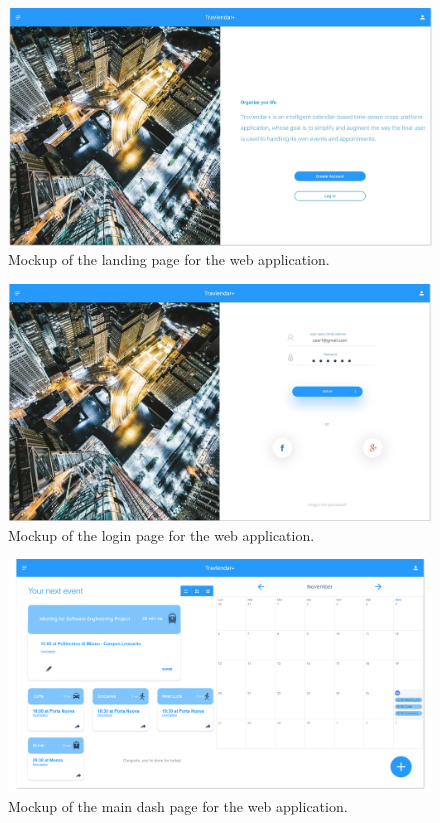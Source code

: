 \begin{figure}
	\centering
	\includegraphics[width=7.5in]{./diagrams/LandingMockupWeb.jpg}
	\caption{Mockup of the landing page for the web application.}
	\label{fig:landingmockupweb}
\end{figure}

\begin{figure}
	\centering
	\includegraphics[width=7.5in]{./diagrams/LoginMockupWeb.jpg}
	\caption{Mockup of the login page for the web application.}
	\label{fig:loginmockupweb}
\end{figure}

\begin{figure}
	\centering
	\includegraphics[width=7.5in]{./diagrams/MainDashMockupWeb.png}
	\caption{Mockup of the main dash page for the web application.}
	\label{fig:maindashmockupweb}
\end{figure}